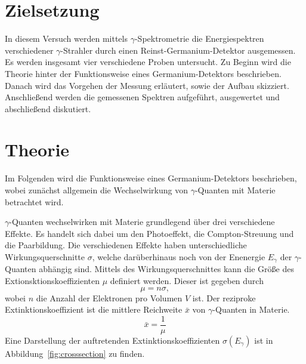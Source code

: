 \section{Zielsetzung}
\label{sec:zielsetzung}

In diesem Versuch werden mittels $\gamma$-Spektrometrie die Energiespektren verschiedener
$\gamma$-Strahler durch einen Reinst-Germanium-Detektor ausgemessen.
Es werden insgesamt vier verschiedene Proben untersucht.
Zu Beginn wird die Theorie hinter der Funktionsweise eines Germanium-Detektors
beschrieben. Danach wird das Vorgehen der Messung erläutert, sowie der Aufbau
skizziert. Anschließend werden die gemessenen Spektren aufgeführt, ausgewertet und
abschließend diskutiert.

\section{Theorie}
\label{sec:theorie}

Im Folgenden wird die Funktionsweise eines Germanium-Detektors beschrieben,
wobei zunächst allgemein die Wechselwirkung von $\gamma$-Quanten mit Materie
betrachtet wird.

$\gamma$-Quanten wechselwirken mit Materie grundlegend über drei verschiedene Effekte.
Es handelt sich dabei um den Photoeffekt, die Compton-Streuung und die Paarbildung.
Die verschiedenen Effekte haben unterschiedliche Wirkungsquerschnitte $\sigma$,
welche darüberhinaus noch von der Enenergie $E_{\gamma}$ der $\gamma$-Quanten abhängig sind.
Mittels des Wirkungsquerschnittes kann die Größe des Extionsktionskoeffizienten $\mu$
definiert werden. Dieser ist gegeben durch
\begin{equation}
  \label{eqn:ext}
  \mu = n\sigma,
\end{equation}
wobei $n$ die Anzahl der Elektronen pro Volumen $V$ ist.
Der reziproke Extinktionskoeffizient ist die mittlere Reichweite $\bar{x}$
von $\gamma$-Quanten in Materie.
\begin{equation}
  \bar{x} = \frac{1}{\mu}
\end{equation}
Eine Darstellung der auftretenden Extinktionskoeffizienten $\sigma(E_{\gamma})$ ist in
Abbildung~\ref{fig:crosssection} zu finden.

